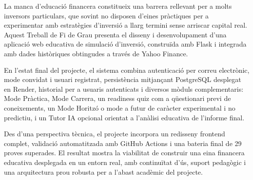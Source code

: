 \documentclass[twoside,spanish,a4paper,12pt]{tfg}
\begin{document}
\begin{abstract}
\setlength{\parskip}{1em}
Financial illiteracy remains a significant barrier for many retail investors, who often lack practical tools to experiment with long-term investment strategies without risking real capital. This Final Degree Project presents the design and development of an educational web application for investment simulation, built with Flask and integrated with historical market data obtained through Yahoo Finance.

In its final state, the system combines email-based authentication, guest and registered-user modes, persistence through PostgreSQL deployed on Render, history for authenticated users and several complementary modules: Practice Mode, Career Mode, a readiness quiz used as a prior knowledge checkpoint, an experimental non-predictive Horizon Mode or future-oriented mode, and an optional AI Tutor designed to support the educational interpretation of the final report.

From a technical perspective, the project incorporates a complete frontend redesign, automated validation through GitHub Actions and a final test suite with 29 passing tests. The resulting application shows the feasibility of building an educational financial tool deployed in a real environment, with continuity of use, pedagogical support and a sufficiently robust architecture for the academic scope of the project.
\end{abstract}
\cleardoublepage

\begin{resum}
\setlength{\parskip}{1em}
La manca d’educació financera constitueix una barrera rellevant per a molts inversors particulars, que sovint no disposen d’eines pràctiques per a experimentar amb estratègies d’inversió a llarg termini sense arriscar capital real. Aquest Treball de Fi de Grau presenta el disseny i desenvolupament d’una aplicació web educativa de simulació d’inversió, construïda amb Flask i integrada amb dades històriques obtingudes a través de Yahoo Finance.

En l’estat final del projecte, el sistema combina autenticació per correu electrònic, mode convidat i usuari registrat, persistència mitjançant PostgreSQL desplegat en Render, historial per a usuaris autenticats i diversos mòduls complementaris: Mode Pràctica, Mode Carrera, un readiness quiz com a qüestionari previ de coneixements, un Mode Horitzó o mode a futur de caràcter experimental i no predictiu, i un Tutor IA opcional orientat a l’anàlisi educativa de l’informe final.

Des d’una perspectiva tècnica, el projecte incorpora un redisseny frontend complet, validació automatitzada amb GitHub Actions i una bateria final de 29 proves superades. El resultat mostra la viabilitat de construir una eina financera educativa desplegada en un entorn real, amb continuïtat d’ús, suport pedagògic i una arquitectura prou robusta per a l’abast acadèmic del projecte.
\end{resum}
\cleardoublepage
\end{document}
